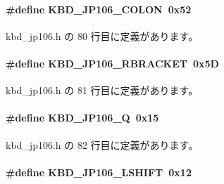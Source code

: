\paragraph[{K\+B\+D\+\_\+\+J\+P106\+\_\+\+C\+O\+L\+O\+N}]{\setlength{\rightskip}{0pt plus 5cm}\#define K\+B\+D\+\_\+\+J\+P106\+\_\+\+C\+O\+L\+O\+N~0x52}\label{kbd__jp106_8h_a65d5198ef93cba23fc498c20857bc65d_a65d5198ef93cba23fc498c20857bc65d}


 kbd\+\_\+jp106.\+h の 80 行目に定義があります。

\paragraph[{K\+B\+D\+\_\+\+J\+P106\+\_\+\+R\+B\+R\+A\+C\+K\+E\+T}]{\setlength{\rightskip}{0pt plus 5cm}\#define K\+B\+D\+\_\+\+J\+P106\+\_\+\+R\+B\+R\+A\+C\+K\+E\+T~0x5\+D}\label{kbd__jp106_8h_aa5895bd010c0fa28c834744dea86f8fc_aa5895bd010c0fa28c834744dea86f8fc}


 kbd\+\_\+jp106.\+h の 81 行目に定義があります。

\paragraph[{K\+B\+D\+\_\+\+J\+P106\+\_\+\+Q}]{\setlength{\rightskip}{0pt plus 5cm}\#define K\+B\+D\+\_\+\+J\+P106\+\_\+\+Q~0x15}\label{kbd__jp106_8h_a6ddac9f757f187d45626571f90c4a14b_a6ddac9f757f187d45626571f90c4a14b}


 kbd\+\_\+jp106.\+h の 82 行目に定義があります。

\paragraph[{K\+B\+D\+\_\+\+J\+P106\+\_\+\+L\+S\+H\+I\+F\+T}]{\setlength{\rightskip}{0pt plus 5cm}\#define K\+B\+D\+\_\+\+J\+P106\+\_\+\+L\+S\+H\+I\+F\+T~0x12}\label{kbd__jp106_8h_ad23e4472cdac4c764a02b1deff70f303_ad23e4472cdac4c764a02b1deff70f303}


